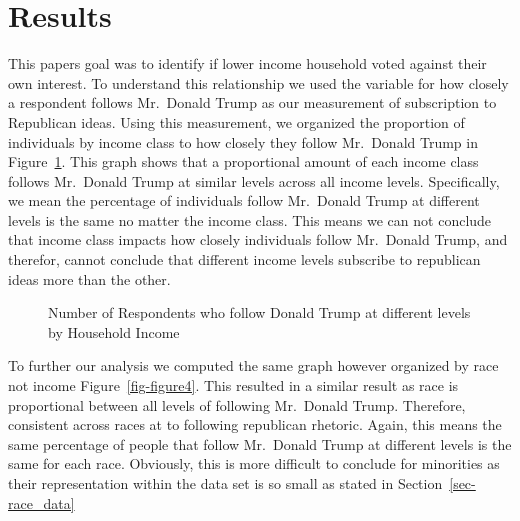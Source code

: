 \documentclass[
  letterpaper,
  DIV=11,
  numbers=noendperiod]{scrartcl}
\begin{document}
\section{Results}\label{sec-results}

This papers goal was to identify if lower income household voted against
their own interest. To understand this relationship we used the variable
for how closely a respondent follows Mr.~Donald Trump as our measurement
of subscription to Republican ideas. Using this measurement, we
organized the proportion of individuals by income class to how closely
they follow Mr.~Donald Trump in Figure~\ref{fig-figure3}. This graph
shows that a proportional amount of each income class follows Mr.~Donald
Trump at similar levels across all income levels. Specifically, we mean
the percentage of individuals follow Mr.~Donald Trump at different
levels is the same no matter the income class. This means we can not
conclude that income class impacts how closely individuals follow
Mr.~Donald Trump, and therefor, cannot conclude that different income
levels subscribe to republican ideas more than the other.

\begin{figure}


\caption{\label{fig-figure3}Number of Respondents who follow Donald
Trump at different levels by Household Income}

\end{figure}%

To further our analysis we computed the same graph however organized by
race not income Figure~\ref{fig-figure4}. This resulted in a similar
result as race is proportional between all levels of following
Mr.~Donald Trump. Therefore, consistent across races at to following
republican rhetoric. Again, this means the same percentage of people
that follow Mr.~Donald Trump at different levels is the same for each
race. Obviously, this is more difficult to conclude for minorities as
their representation within the data set is so small as stated in
Section~\ref{sec-race_data}
\end{document}
